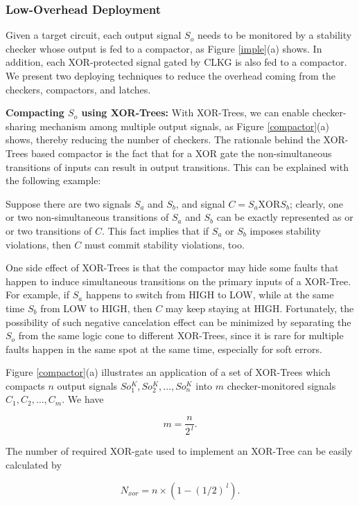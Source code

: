 \subsubsection{Low-Overhead Deployment}
Given a target circuit, each output signal $S_o$ needs to be monitored by a
stability checker whose output is fed to a compactor, as Figure \ref{imple}(a)
shows. In addition, each XOR-protected signal gated by CLKG is also fed to a
compactor.   We present two deploying techniques to reduce the overhead coming from
the checkers, compactors, and latches.

\textbf{Compacting $S_o$ using XOR-Trees:} With XOR-Trees, we can enable checker-sharing mechanism among multiple output
signals, as Figure \ref{compactor}(a) shows, thereby reducing the number of
checkers. The rationale behind the XOR-Trees based compactor is the fact that for a XOR gate the non-simultaneous transitions of inputs can result in output transitions. This can be explained with the following example:

Suppose there are two signals $S_a$ and $S_b$, and signal $C = S_a \mbox{XOR} S_b$;
clearly, one or two non-simultaneous transitions of $S_a$ and $S_b$ can be exactly represented as or or two transitions of $C$. This fact implies that if $S_a$ or $S_b$ imposes stability violations, then $C$ must commit stability violations, too.

One side effect of XOR-Trees is that the compactor may hide some faults that happen to induce simultaneous transitions on the primary inputs of a XOR-Tree. For example, if $S_a$ happens to switch from HIGH to LOW, while at the same time $S_b$ from LOW to HIGH, then  $C$ may keep staying at HIGH. Fortunately, the possibility of such negative cancelation effect can be minimized by separating the $S_o$ from the same logic cone to different XOR-Trees, since it is rare for multiple faults happen in the same spot at the same time, especially for soft errors.

Figure \ref{compactor}(a) illustrates an application of a set of XOR-Trees which compacts $n$ output signals $So_1^K, So_2^K,\ldots, So_n^K$ into $m$ checker-monitored signals $C_1, C_2, \ldots, C_m$. We have 

\begin{equation}
m=\frac{n}{2^{\,l}}.
\end{equation}

The number of required XOR-gate used to implement an XOR-Tree can be easily calculated by

\begin{equation}\label{nxor}
  N_{xor}=n\times (1-(1/2)^{\,l}).
\end{equation}

